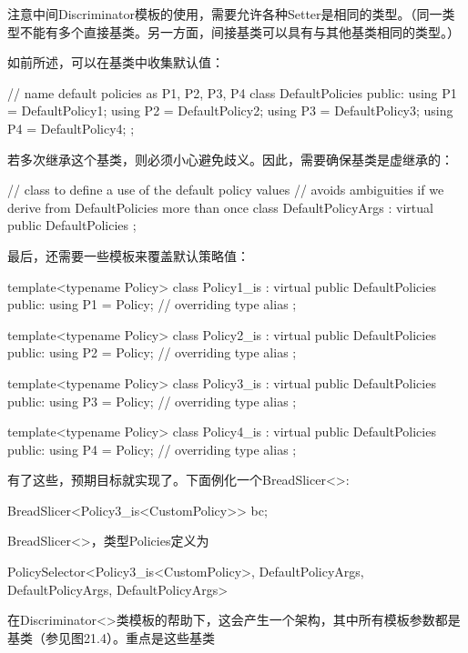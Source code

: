 注意中间Discriminator模板的使用，需要允许各种Setter是相同的类型。（同一类型不能有多个直接基类。另一方面，间接基类可以具有与其他基类相同的类型。）

如前所述，可以在基类中收集默认值：

\begin{cpp}
// name default policies as P1, P2, P3, P4
class DefaultPolicies {
	public:
	using P1 = DefaultPolicy1;
	using P2 = DefaultPolicy2;
	using P3 = DefaultPolicy3;
	using P4 = DefaultPolicy4;
};
\end{cpp}

若多次继承这个基类，则必须小心避免歧义。因此，需要确保基类是虚继承的：

\begin{cpp}
// class to define a use of the default policy values
// avoids ambiguities if we derive from DefaultPolicies more than once
class DefaultPolicyArgs : virtual public DefaultPolicies {
};
\end{cpp}

最后，还需要一些模板来覆盖默认策略值：

\begin{cpp}
template<typename Policy>
class Policy1_is : virtual public DefaultPolicies {
	public:
	using P1 = Policy; // overriding type alias
};

template<typename Policy>
class Policy2_is : virtual public DefaultPolicies {
	public:
	using P2 = Policy; // overriding type alias
};

template<typename Policy>
class Policy3_is : virtual public DefaultPolicies {
	public:
	using P3 = Policy; // overriding type alias
};

template<typename Policy>
class Policy4_is : virtual public DefaultPolicies {
	public:
	using P4 = Policy; // overriding type alias
};
\end{cpp}

有了这些，预期目标就实现了。下面例化一个BreadSlicer<>:

\begin{cpp}
BreadSlicer<Policy3_is<CustomPolicy>> bc;
\end{cpp}

BreadSlicer<>，类型Policies定义为

\begin{cpp}
PolicySelector<Policy3_is<CustomPolicy>,
				DefaultPolicyArgs,
				DefaultPolicyArgs,
				DefaultPolicyArgs>
\end{cpp}

在Discriminator<>类模板的帮助下，这会产生一个架构，其中所有模板参数都是基类（参见图21.4）。重点是这些基类

